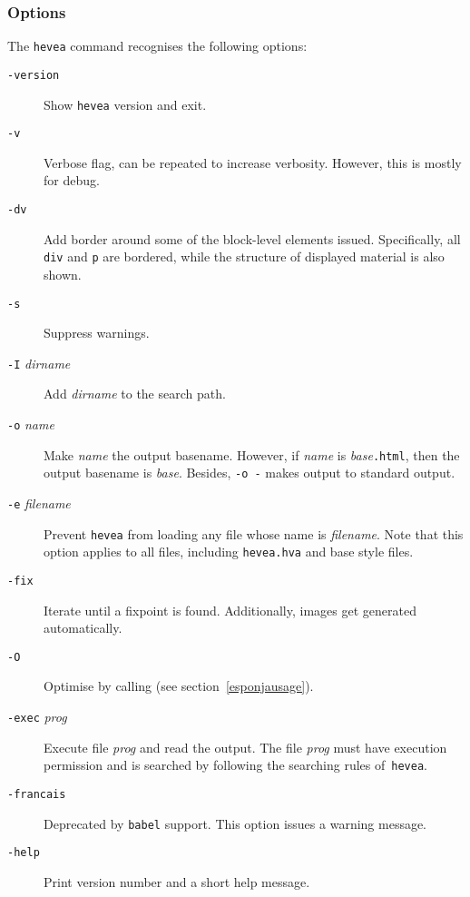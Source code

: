 \subsubsection{\label{heveaoptions}Options}
The \texttt{hevea} command recognises the following options:
\begin{description}
\item[{\tt -version}] Show \texttt{hevea} version and exit.
\item[{\tt -v}] Verbose flag, can be repeated to increase
verbosity. However, this is mostly for debug.
\item[{\tt -dv}] Add border around some of the block-level
elements issued. Specifically, all \verb+div+ and \verb+p+ are bordered,
while the structure of displayed material is also shown.
\item[{\tt -s}] Suppress warnings.
\item[{\tt -I} {\it dirname}] Add {\it dirname} to the search path.
\item[{\tt -o} {\it name}] Make \textit{name} the output basename.
However, if \textit{name} is \textit{base}\texttt{.html}, then
the output basename is \textit{base}.
Besides, {\tt -o -} makes \hevea{} output to standard output.
\item[{\tt -e} {\it filename}] Prevent \texttt{hevea} from loading any file
whose name is \textit{filename}. Note that this option applies to all
files, including \texttt{hevea.hva} and base style files.
\item[{\tt -fix}] Iterate \hevea{} until a fixpoint is found.
Additionally, images get generated automatically.
\item[{\tt -O}] Optimise \html{} by calling \esponja{} (see
section~\ref{esponjausage}).
\item[{\tt -exec} {\it prog}] Execute file \textit{prog} and read the
output. The file \textit{prog} must have execution permission and is
searched by following the searching rules of~\texttt{hevea}.
\item[{\tt -francais}] Deprecated by \texttt{babel} support. This
option issues a warning message.
\item[{\tt -help}] Print version number and a short help message.
\end{description}

